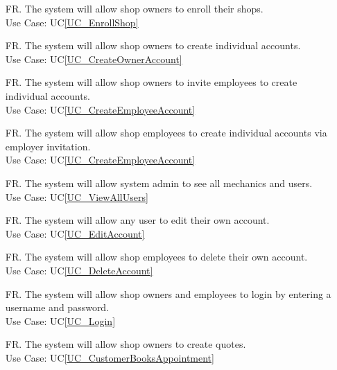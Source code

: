 \documentclass[12pt]{article}
\newcounter{reqnum} %
\begin{document}
\noindent \begin{itemize}

\item[FR\refstepcounter{reqnum}\thereqnum \label{R_EnrollShop}.] The system will allow shop owners to enroll their shops.\\
Use Case: UC\ref{UC_EnrollShop}

\item[FR\refstepcounter{reqnum}\thereqnum \label{R_CreateOwnerAccount}.] The system will allow shop owners to create individual accounts.\\
Use Case: UC\ref{UC_CreateOwnerAccount}

\item[FR\refstepcounter{reqnum}\thereqnum \label{R_InviteEmployee}.] The system will allow shop owners to invite employees to create individual accounts.\\
Use Case: UC\ref{UC_CreateEmployeeAccount}

\item[FR\refstepcounter{reqnum}\thereqnum \label{R_CreateEmployeeAccount}.] The system will allow shop employees to create individual accounts via employer invitation.\\
Use Case: UC\ref{UC_CreateEmployeeAccount}

\item[FR\refstepcounter{reqnum}\thereqnum \label{R_SeeAllUsers}.] The system will allow system admin to see all mechanics and users.\\
Use Case: UC\ref{UC_ViewAllUsers}

\item[FR\refstepcounter{reqnum}\thereqnum \label{R_EditAccount}.] The system will allow any user to edit their own account.\\
Use Case: UC\ref{UC_EditAccount}

\item[FR\refstepcounter{reqnum}\thereqnum \label{R_DeleteAccount}.] The system will allow shop employees to delete their own account.\\
Use Case: UC\ref{UC_DeleteAccount}

\item[FR\refstepcounter{reqnum}\thereqnum \label{R_Login}.] The system will allow shop owners and employees to login by entering a username and password.\\
Use Case: UC\ref{UC_Login}

\addtocounter{reqnum}{1}
\item[FR\refstepcounter{reqnum}\thereqnum \label{R_CreateQuote}.] The system will allow shop owners to create quotes.\\
Use Case: UC\ref{UC_CustomerBooksAppointment}


\end{itemize}
\end{document}
